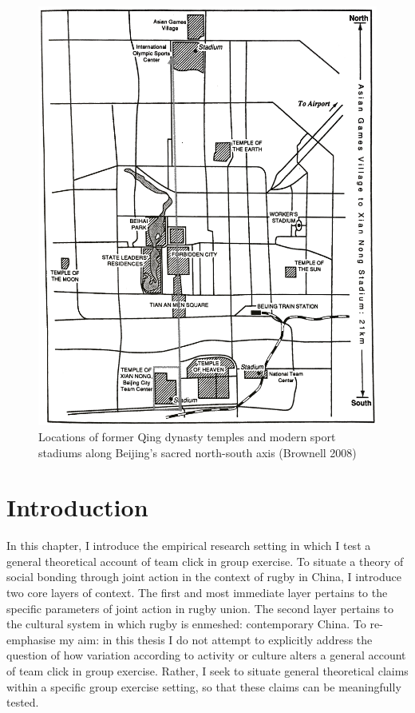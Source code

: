 \begin{CJK}{UTF8}{gbsn}
\begin{figure}[htbp]
    \centering
  \includegraphics[scale =.1]{images/beijingTemplesXNT.png}
  \caption{Locations of former Qing dynasty temples and modern sport stadiums along Beijing's sacred north-south axis (Brownell 2008)}
  \label{fig:beijingTemplesXNT}
\end{figure}



\section{Introduction}

In this chapter, I introduce the empirical research setting in which I test a general theoretical account of team click in group exercise.  To situate a theory of social bonding through joint action in the context of rugby in China, I introduce two core layers of context.  The first and most immediate layer pertains to the specific parameters of joint action in rugby union.  The second layer pertains to the cultural system in which rugby is enmeshed: contemporary China.  To re-emphasise my aim: in this thesis I do not attempt to explicitly address the question of how variation according to activity or culture alters a general account of team click in group exercise.  Rather, I seek to situate general theoretical claims within a specific group exercise setting, so that these claims can be meaningfully tested.



\end{CJK}
